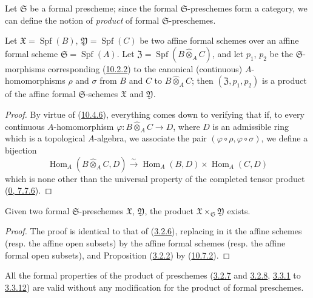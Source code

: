 \begin{env}[10.7.1]
\label{I.10.7.1}
Let $\mathfrak{S}$ be a formal prescheme; since the formal
$\mathfrak{S}$-preschemes form a category, we can define the notion of
\emph{product} of formal $\mathfrak{S}$-preschemes.
\end{env}

\begin{proposition}[10.7.2]
\label{I.10.7.2}
Let $\mathfrak{X}=\operatorname{Spf}(B)$,
$\mathfrak{Y}=\operatorname{Spf}(C)$ be two affine formal schemes
over an affine formal scheme
$\mathfrak{S}=\operatorname{Spf}(A)$. Let
$\mathfrak{Z}=\operatorname{Spf}(B\widehat{\otimes}_A C)$, and let
$p_1$, $p_2$ be the $\mathfrak{S}$-morphisms corresponding
(\hyperref[I.10.2.2]{10.2.2}) to the canonical (continuous)
$A$-homomorphisms $\rho$ and $\sigma$ from $B$ and $C$ to
$B\widehat{\otimes}_A C$; then $(\mathfrak{Z},p_1,p_2)$ is a product
of the affine formal $\mathfrak{S}$-schemes $\mathfrak{X}$ and
$\mathfrak{Y}$.
\end{proposition}

\begin{proof}
By virtue of (\hyperref[I.10.4.6]{10.4.6}), everything comes down to
verifying that if, to every continuous $A$-homomorphism
$\varphi:B\widehat{\otimes}_A C\to D$, where $D$ is an admissible ring
which is a topological $A$-algebra, we associate the pair
$(\varphi\circ\rho,\varphi\circ\sigma)$, we define a bijection
\[
  \operatorname{Hom}_A(B\widehat{\otimes}_A C,D)
  \xrightarrow{\sim}
  \operatorname{Hom}_A(B,D)\times\operatorname{Hom}_A(C,D)
\]
which is none other than the universal property of the completed
tensor product (\hyperref[0.7.7.6]{0, 7.7.6}).
\end{proof}

\begin{proposition}[10.7.3]
\label{I.10.7.3}
Given two formal $\mathfrak{S}$-preschemes
$\mathfrak{X}$, $\mathfrak{Y}$, the product
$\mathfrak{X}\times_{\mathfrak{S}}\mathfrak{Y}$ exists.
\end{proposition}

\begin{proof}
The proof is identical to that of
(\hyperref[I.3.2.6]{3.2.6}), replacing in it the affine schemes
(resp. the affine open subsets) by the affine formal schemes (resp. the
affine formal open subsets), and Proposition
(\hyperref[I.3.2.2]{3.2.2}) by
(\hyperref[I.10.7.2]{10.7.2}).
\end{proof}

All the formal properties of the product of preschemes
(\hyperref[I.3.2.7]{3.2.7} and
\hyperref[I.3.2.8]{3.2.8},
\hyperref[I.3.3.1]{3.3.1} to
\hyperref[I.3.3.12]{3.3.12}) are valid without any modification
for the product of formal preschemes.


